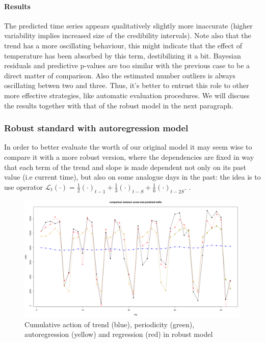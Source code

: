 \documentclass[11pt,twoside]{report}
\begin{document}
\paragraph{Results} The predicted time series appears qualitatively slightly more inaccurate (higher variability implies increased size of the credibility intervals). Note also that the trend has a more oscillating behaviour, this might indicate that the effect of temperature has been absorbed by this term, destibilizing it a bit. Bayesian residuals and predictive p-values are too similar with the previous case to be a direct matter of comparison. Also the estimated number outliers is always oscillating betwen two and three. Thus, it's better to entrust this role to other more effective strategies, like automatic evaluation procedures. We will discuss the results together with that of the robust model in the next paragraph.

\subsubsection{Robust standard with autoregression model}
In order to better evaluate the worth of our original model it may seem wise to compare it with a more robust version, where the dependencies are fixed in way that each term of the trend and slope is made dependent not only on its past value (i.e current time), but also on some analogue days in the past: the idea is to use operator $ \mathcal{L}_t(\cdot) = \frac{1}{2}(\cdot)_{t-1} + \frac{1}{3}(\cdot)_{t-S} +\frac{1}{6}(\cdot)_{t-2S} $. .
\begin{figure}[H]
	\centering
	\includegraphics[width=150 mm]{pictures/m4_p1.png}
	\caption{Cumulative action of trend (blue), periodicity (green), autoregression (yellow) and regression (red) in robust model}
	\label{fig:M4_p1}
\end{figure}
\end{document}
